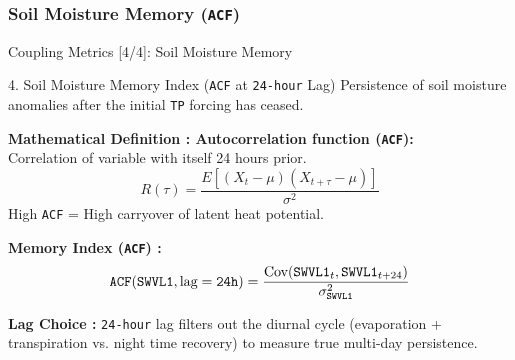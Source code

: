 \documentclass[8pt, aspectratio=169]{beamer}
\begin{document}
\subsubsection{Soil Moisture Memory (\texttt{ACF})}
\begin{frame}{Coupling Metrics [4/4]: Soil Moisture Memory}
    \vspace{-0.2cm}
    \footnotesize
    \begin{block}{4. Soil Moisture Memory Index (\texttt{ACF} at \texttt{24-hour} Lag)}
        Persistence of soil moisture anomalies after the initial \texttt{TP} forcing has ceased.

        \vspace{0.2cm}
        \textbf{Mathematical Definition : Autocorrelation function (\texttt{ACF}):} \\
        Correlation of variable with itself 24 hours prior.
        \begin{equation}
            R(\tau) = \frac{E[(X_t - \mu)(X_{t+\tau} - \mu)]}{\sigma^2}
        \end{equation}
        High \texttt{ACF} = High carryover of latent heat potential.

        \vspace{0.2cm}
        \textbf{Memory Index (\texttt{ACF}) :}
        \begin{equation}
            \text{\texttt{ACF}}(\text{\texttt{SWVL1}}, \text{lag}=\texttt{24h}) = \frac{\text{Cov}(\text{\texttt{SWVL1}}_t, \text{\texttt{SWVL1}}_{t+24})}{\sigma_{\text{\texttt{SWVL1}}}^2}
        \end{equation} \cite{seneviratne2010investigating}


        \textbf{Lag Choice :} \texttt{24-hour} lag filters out the diurnal cycle (evaporation + transpiration vs. night time recovery) to measure true multi-day persistence.
    \end{block}


\end{frame}
\end{document}
